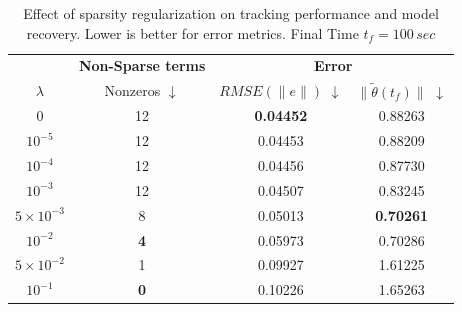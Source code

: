 \documentclass[conference]{ieeeconf}
\begin{document}
\begin{table}[t]
\centering
\caption{Effect of sparsity regularization on tracking performance and model recovery. Lower is better for error metrics. Final Time {$t_f=100 \,sec$}}
\label{tab:main_results}
\setlength{\tabcolsep}{5pt}
\renewcommand{\arraystretch}{1.15}

\begin{tabular}{c|c|cc}
\toprule
& \textbf{Non-Sparse terms} & \multicolumn{2}{c}{\textbf{Error}} \\
$\lambda$ & Nonzeros $\downarrow$ & $RMSE(\|e\|)$ $\downarrow$ & $\|\tilde{\theta}(t_f)\|$ $\downarrow$ \\
\midrule

0 
& 12 & \textbf{0.04452} & 0.88263 \\

$10^{-5}$ 
& 12 & 0.04453 & 0.88209 \\

$10^{-4}$ 
& 12 & 0.04456 & 0.87730 \\

$10^{-3}$ 
& 12 & 0.04507 & 0.83245 \\

$5\times10^{-3}$ 
& 8  & 0.05013 & \textbf{0.70261} \\

$10^{-2}$ 
& \textbf{4}  & 0.05973 & 0.70286 \\

$5\times10^{-2}$ 
& 1  & 0.09927 & 1.61225 \\

$10^{-1}$ 
& \textbf{0}  & 0.10226 & 1.65263 \\

\bottomrule
\end{tabular}
\end{table}
\end{document}
